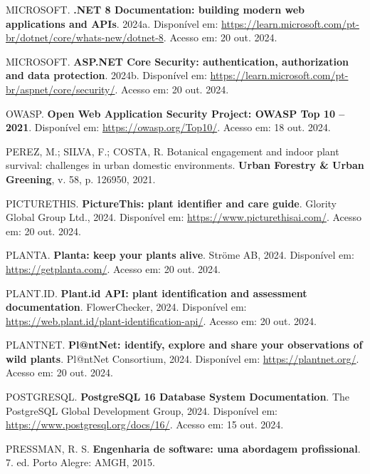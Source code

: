\documentclass[12pt,a4paper]{article}
\begin{document}
\vspace{0.2cm}
\noindent MICROSOFT. \textbf{.NET 8 Documentation: building modern web applications and APIs}. 2024a. Disponível em: \url{https://learn.microsoft.com/pt-br/dotnet/core/whats-new/dotnet-8}. Acesso em: 20 out. 2024.

\vspace{0.2cm}
\noindent MICROSOFT. \textbf{ASP.NET Core Security: authentication, authorization and data protection}. 2024b. Disponível em: \url{https://learn.microsoft.com/pt-br/aspnet/core/security/}. Acesso em: 20 out. 2024.

\vspace{0.2cm}
\noindent OWASP. \textbf{Open Web Application Security Project: OWASP Top 10 -- 2021}. Disponível em: \url{https://owasp.org/Top10/}. Acesso em: 18 out. 2024.

\vspace{0.2cm}
\noindent PEREZ, M.; SILVA, F.; COSTA, R. Botanical engagement and indoor plant survival: challenges in urban domestic environments. \textbf{Urban Forestry \& Urban Greening}, v. 58, p. 126950, 2021.

\vspace{0.2cm}
\noindent PICTURETHIS. \textbf{PictureThis: plant identifier and care guide}. Glority Global Group Ltd., 2024. Disponível em: \url{https://www.picturethisai.com/}. Acesso em: 20 out. 2024.

\vspace{0.2cm}
\noindent PLANTA. \textbf{Planta: keep your plants alive}. Ströme AB, 2024. Disponível em: \url{https://getplanta.com/}. Acesso em: 20 out. 2024.

\vspace{0.2cm}
\noindent PLANT.ID. \textbf{Plant.id API: plant identification and assessment documentation}. FlowerChecker, 2024. Disponível em: \url{https://web.plant.id/plant-identification-api/}. Acesso em: 20 out. 2024.

\vspace{0.2cm}
\noindent PLANTNET. \textbf{Pl@ntNet: identify, explore and share your observations of wild plants}. Pl@ntNet Consortium, 2024. Disponível em: \url{https://plantnet.org/}. Acesso em: 20 out. 2024.

\vspace{0.2cm}
\noindent POSTGRESQL. \textbf{PostgreSQL 16 Database System Documentation}. The PostgreSQL Global Development Group, 2024. Disponível em: \url{https://www.postgresql.org/docs/16/}. Acesso em: 15 out. 2024.

\vspace{0.2cm}
\noindent PRESSMAN, R. S. \textbf{Engenharia de software: uma abordagem profissional}. 7. ed. Porto Alegre: AMGH, 2015.
\end{document}

